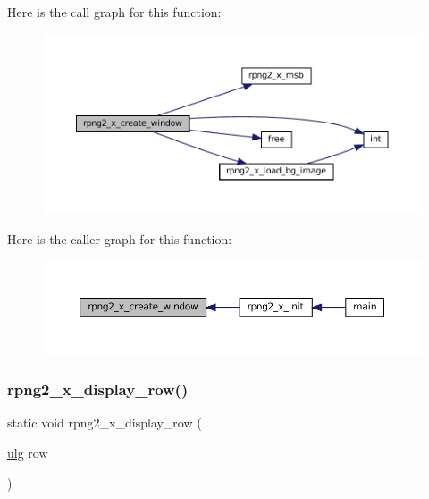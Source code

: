 Here is the call graph for this function\+:
\nopagebreak
\begin{figure}[H]
\begin{center}
\leavevmode
\includegraphics[width=350pt]{rpng2-x_8c_aa1d3f0f82dec46874ea19ffa781cb1f7_cgraph}
\end{center}
\end{figure}
Here is the caller graph for this function\+:
\nopagebreak
\begin{figure}[H]
\begin{center}
\leavevmode
\includegraphics[width=350pt]{rpng2-x_8c_aa1d3f0f82dec46874ea19ffa781cb1f7_icgraph}
\end{center}
\end{figure}
\mbox{\label{rpng2-x_8c_a249f2f9baf0276621e94b788cd6d34c3}} 
\subsubsection{\texorpdfstring{rpng2\+\_\+x\+\_\+display\+\_\+row()}{rpng2\_x\_display\_row()}}
{\footnotesize\ttfamily static void rpng2\+\_\+x\+\_\+display\+\_\+row (\begin{DoxyParamCaption}\item[{\mbox{\hyperlink{readpng_8h_abd6f60bf9450af2ecb94097a32c19a64}{ulg}}}]{row }\end{DoxyParamCaption})\hspace{0.3cm}{\ttfamily [static]}}

